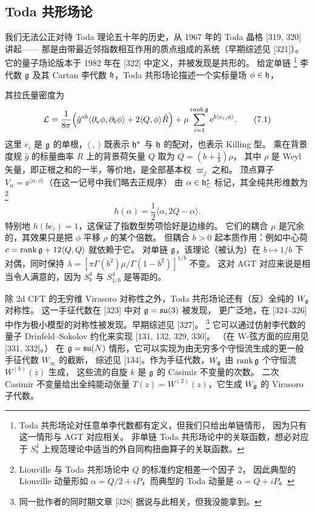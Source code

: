 \subsection{Toda 共形场论}

我们无法公正对待 Toda 理论五十年的历史，从 1967 年的 Toda 晶格 [319, 320] 讲起------
那是由带最近邻指数相互作用的质点组成的系统（早期综述见 [321]）。
它的量子场论版本于 1982 年在 [322] 中定义，并被发现是共形的。
给定单链
\footnote{Toda 共形场论对任意单李代数都有定义，但我们只给出单链情形，
因为只有这一情形与 AGT 对应相关。
非单链 Toda 共形场论中的关联函数，想必对应于 $S^4_b$ 上规范理论中适当的外自同构扭曲算子的关联函数。}
李代数 $\mathfrak{g}$ 及其 Cartan 李代数 $\mathfrak{h}$，Toda 共形场论描述一个实标量场 $\phi\in\mathfrak{h}$，

其拉氏量密度为
\begin{equation}
\mathcal{L}=\frac{1}{8\pi}\Big(\hat g^{ab}\langle\partial_a\phi,\partial_b\phi\rangle
+2\langle Q,\phi\rangle\hat R\Big)
+\mu\sum_{i=1}^{\operatorname{rank}\mathfrak{g}}\mathrm{e}^{b\langle e_i,\phi\rangle}.
\tag{7.1}
\end{equation}
这里 $e_i$ 是 $\mathfrak{g}$ 的单根，$\langle\ ,\ \rangle$ 既表示 $\mathfrak{h}^*$ 与 $\mathfrak{h}$ 的配对，也表示 Killing 型。
乘在背景度规 $\hat g$ 的标量曲率 $\hat R$ 上的背景荷矢量 $Q$ 取为 $Q=(b+\frac{1}{b})\rho$，
其中 $\rho$ 是 Weyl 矢量，即正根之和的一半，等价地，是全部基本权 $\varpi_j$ 之和。
顶点算子 $V_\alpha=\ee^{\langle\alpha,\phi\rangle}$（在这一记号中我们略去正规序）
由 $\alpha\in\mathfrak{h}^*_{\mathbb{C}}$ 标记，其全纯共形维数为
\footnote{Liouville 与 Toda 共形场论中 $Q$ 的标准约定相差一个因子 2，
因此典型的 Liouville 动量形如 $\alpha=Q/2+iP$，而典型的 Toda 动量是 $\alpha=Q+iP$。}
\begin{equation}
h(\alpha)=\frac{1}{2}\langle\alpha,2Q-\alpha\rangle.
\tag{7.2}
\end{equation}
特别地 $h(be_i)=1$，这保证了指数型势项恰好是边缘的。
它们的耦合 $\mu$ 是冗余的，其效果只是把 $\phi$ 平移 $\rho$ 的某个倍数。
但耦合 $b>0$ 起本质作用：例如中心荷 $c=\operatorname{rank}\mathfrak{g}+12\langle Q,Q\rangle$ 就依赖于它。
对单链 $\mathfrak{g}$，该理论（被认为）在 $b\mapsto 1/b$ 下对偶，同时保持
$\lambda=[\pi\Gamma(b^2)\mu/\Gamma(1-b^2)]^{1/b}$ 不变。
这对 AGT 对应来说是相当令人满意的，因为 $S^4_b$ 与 $S^4_{1/b}$ 是等距的。

除 2d CFT 的无穷维 Virasoro 对称性之外，Toda 共形场论还有（反）全纯的 $W_{\mathfrak{g}}$ 对称性。
这一手征代数在 [323] 中对 $\mathfrak{g}=\mathfrak{su}(3)$ 被发现，
更广泛地，在 [324--326] 中作为极小模型的对称性被发现。早期综述见 [327]。
\footnote{同一批作者的同时期文章 [328] 据说与此相关，但我没能拿到。}
它可以通过仿射李代数的量子 Drinfeld--Sokolov 约化来实现 [131, 132, 329, 330]。
（在 W-弦方面的应用见 [331, 332]。）
在 $\mathfrak{g}=\mathfrak{su}(N)$ 情形，它可以实现为由无穷多个守恒流生成的更一般手征代数 $W_\infty$ 的截断，
综述见 [134]。作为手征代数，$W_{\mathfrak{g}}$ 由 $\operatorname{rank}\mathfrak{g}$ 个守恒流 $W^{(k)}(z)$ 生成，
这些流的自旋 $k$ 是 $\mathfrak{g}$ 的 Casimir 不变量的次数。
二次 Casimir 不变量给出全纯能动张量 $T(z)=W^{(2)}(z)$，它生成 $W_{\mathfrak{g}}$ 的 Virasoro 子代数。

